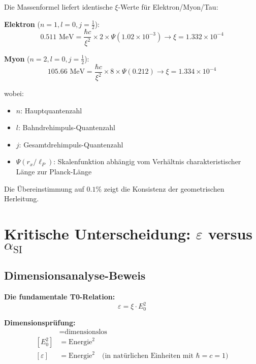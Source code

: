 \documentclass[12pt,a4paper]{article}
\numberwithin{equation}{section}
\newcommand{\xipar}{\xi}
\newcommand{\epsilonT}{\varepsilon}
\newcommand{\alphaSI}{\alpha_{\text{SI}}}
\newcommand{\Eo}{E_0}
\begin{document}
	Die Massenformel liefert identische $\xipar$-Werte für Elektron/Myon/Tau:
	
	\textbf{Elektron} ($n=1, l=0, j=\frac{1}{2}$):
	\begin{equation}
		0.511 \text{ MeV} = \frac{\hbar c}{\xipar^2} \times 2 \times \Psi(1.02 \times 10^{-3}) \rightarrow \xipar = 1.332 \times 10^{-4}
		\label{eq:xi_electron}
	\end{equation}
	
	\textbf{Myon} ($n=2, l=0, j=\frac{1}{2}$):
	\begin{equation}
		105.66 \text{ MeV} = \frac{\hbar c}{\xipar^2} \times 8 \times \Psi(0.212) \rightarrow \xipar = 1.334 \times 10^{-4}
		\label{eq:xi_muon}
	\end{equation}
	
	wobei:
	\begin{itemize}
		\item $n$: Hauptquantenzahl
		\item $l$: Bahndrehimpuls-Quantenzahl
		\item $j$: Gesamtdrehimpuls-Quantenzahl
		\item $\Psi(r_x/\ell_P)$: Skalenfunktion abhängig vom Verhältnis charakteristischer Länge zur Planck-Länge
	\end{itemize}
	
	Die Übereinstimmung auf $0.1\%$ zeigt die Konsistenz der geometrischen Herleitung.
	
	\section{Kritische Unterscheidung: $\epsilonT$ versus $\alphaSI$}
	

	
	\subsection{Dimensionsanalyse-Beweis}
	
	\textbf{Die fundamentale T0-Relation:}
	\begin{equation}
		\epsilonT = \xipar \cdot \Eo^2
		\label{eq:epsilon_fundamental}
	\end{equation}
	
	\textbf{Dimensionsprüfung:}
	\begin{align}
		[\xipar] &= \text{dimensionslos} \\
		[\Eo^2] &= \text{Energie}^2 \\
		[\epsilonT] &= \text{Energie}^2 \quad \text{(in natürlichen Einheiten mit } \hbar = c = 1\text{)}
		\label{eq:dimensions}
	\end{align}
	
\end{document}
